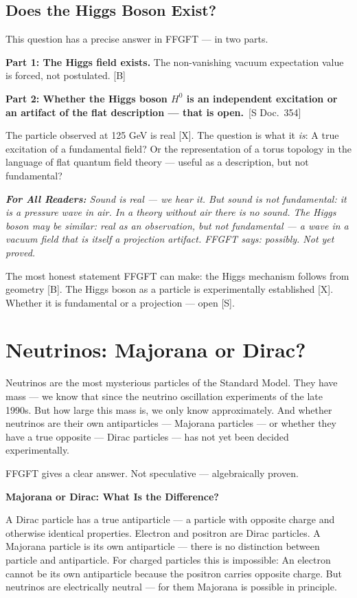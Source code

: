\documentclass[11pt,oneside]{book}
\newcommand{\status}[1]{\penalty10000\,{\scriptsize\textcolor{gray!60}{[#1]}}}
\newenvironment{laierspur}{%
  \par\vspace{4pt}%
  \noindent\small\itshape\color{blue!60!black}%
  \textbf{For All Readers:}\enspace\ignorespaces}{%
  \par\vspace{4pt}\normalsize\normalfont\normalcolor}
\begin{document}
\section*{Does the Higgs Boson Exist?}

This question has a precise answer in FFGFT --- in two parts.

\textbf{Part 1: The Higgs field exists.} The non-vanishing vacuum
expectation value is forced, not postulated. [B]

\textbf{Part 2: Whether the Higgs boson $H^0$ is an independent
excitation or an artifact of the flat description --- that is open.}
\status{S Doc.~354}

The particle observed at 125 GeV is real [X]. The question is what it
\textit{is}: A true excitation of a fundamental field? Or the representation
of a torus topology in the language of flat quantum field theory ---
useful as a description, but not fundamental?

\begin{laierspur}
Sound is real --- we hear it. But sound is not fundamental: it is a
pressure wave in air. In a theory without air there is no sound.
The Higgs boson may be similar: real as an observation, but not
fundamental --- a wave in a vacuum field that is itself a projection
artifact. FFGFT says: possibly. Not yet proved.
\end{laierspur}

The most honest statement FFGFT can make: the Higgs mechanism follows
from geometry [B]. The Higgs boson as a particle is experimentally
established [X]. Whether it is fundamental or a projection --- open [S].

\chapter{Neutrinos: Majorana or Dirac?}

Neutrinos are the most mysterious particles of the Standard Model. They have
mass — we know that since the neutrino oscillation experiments of the late
1990s. But how large this mass is, we only know approximately. And whether
neutrinos are their own antiparticles — Majorana particles — or whether they
have a true opposite — Dirac particles — has not yet been decided
experimentally.

FFGFT gives a clear answer. Not speculative — algebraically proven.

\textbf{Majorana or Dirac: What Is the Difference?}

A Dirac particle has a true antiparticle — a particle with opposite charge
and otherwise identical properties. Electron and positron are Dirac
particles. A Majorana particle is its own antiparticle — there is no
distinction between particle and antiparticle. For charged particles this is
impossible: An electron cannot be its own antiparticle because the positron
carries opposite charge. But neutrinos are electrically neutral — for them
Majorana is possible in principle.
\end{document}

